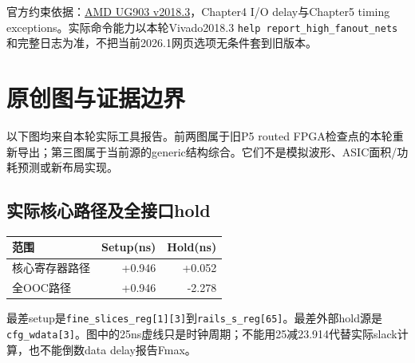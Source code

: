 \documentclass[UTF8,fontset=fandol,10pt,a4paper,openany]{ctexrep}
\newcommand{\code}[1]{\nolinkurl{#1}}
\begin{document}
官方约束依据：\href{https://docs.amd.com/v/u/2018.3-English/ug903-vivado-using-constraints}{AMD UG903 v2018.3}，Chapter4 I/O delay与Chapter5 timing exceptions。实际命令能力以本轮Vivado2018.3 \code{help report_high_fanout_nets}和完整日志为准，不把当前2026.1网页选项无条件套到旧版本。
\chapter{原创图与证据边界}
以下图均来自本轮实际工具报告。前两图属于旧P5 routed FPGA检查点的本轮重新导出；第三图属于当前源的generic结构综合。它们不是模拟波形、ASIC面积/功耗预测或新布局实现。
\section{实际核心路径及全接口hold}
\begin{center}\end{center}
\begin{center}\begin{tabular}{lrr}\toprule 范围&Setup(ns)&Hold(ns)\\\midrule 核心寄存器路径&+0.946&+0.052\\全OOC路径&+0.946&\textcolor{red!70!black}{-2.278}\\\bottomrule\end{tabular}\end{center}
最差setup是\code{fine_slices_reg[1][3]}到\code{rails_s_reg[65]}。最差外部hold源是\code{cfg_wdata[3]}。图中的25ns虚线只是时钟周期；不能用25减23.914代替实际slack计算，也不能倒数data delay报告Fmax。
\end{document}
